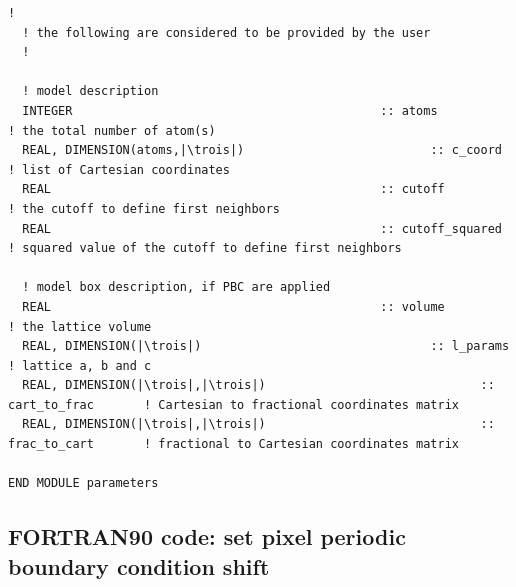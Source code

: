 \begin{lstlisting}[language={[90]FORTRAN}]
  !
  ! the following are considered to be provided by the user
  !

  ! model description
  INTEGER                                           :: atoms              ! the total number of atom(s)
  REAL, DIMENSION(atoms,|\trois|)                          :: c_coord            ! list of Cartesian coordinates
  REAL                                              :: cutoff             ! the cutoff to define first neighbors
  REAL                                              :: cutoff_squared     ! squared value of the cutoff to define first neighbors
  
  ! model box description, if PBC are applied
  REAL                                              :: volume             ! the lattice volume
  REAL, DIMENSION(|\trois|)                                :: l_params           ! lattice a, b and c
  REAL, DIMENSION(|\trois|,|\trois|)                              :: cart_to_frac       ! Cartesian to fractional coordinates matrix
  REAL, DIMENSION(|\trois|,|\trois|)                              :: frac_to_cart       ! fractional to Cartesian coordinates matrix

END MODULE parameters
\end{lstlisting}

\clearpage

\subsection{FORTRAN90 code: set pixel periodic boundary condition shift}
\label{f-set-pshift}


